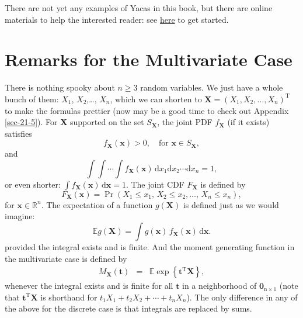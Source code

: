 \documentclass[captions=tableheading]{scrbook}
\begin{document}
There are not yet any examples of Yacas in this book, but there are online materials to help the interested reader: see \href{http://code.google.com/p/ryacas/}{here} to get started.
\section{Remarks for the Multivariate Case}
\label{sec-7-8}
\label{sec-Remarks-for-the-Multivariate}


There is nothing spooky about \(n\geq3\) random variables. We just have a whole bunch of them: \(X_{1}\), \(X_{2}\),\ldots{}, \(X_{n}\), which we can shorten to \(\mathbf{X}=(X_{1},X_{2},\ldots,X_{n})^{\mathrm{T}}\) to make the formulas prettier (now may be a good time to check out Appendix \ref{sec-21-5}). For \(\mathbf{X}\) supported on the set \(S_{\mathbf{X}}\), the joint PDF \(f_{\mathbf{X}}\) (if it exists) satisfies
\begin{equation}
f_{\mathbf{X}}(\mathbf{x})>0,\quad\mbox{for }\mathbf{x}\in S_{\mathbf{X}},
\end{equation}
and
\begin{equation}
\int\!\!\!\int\cdots\int f_{\mathbf{X}}(\mathbf{x})\,\mathrm{d} x_{1}\mathrm{d} x_{2}\cdots\mathrm{d} x_{n}=1,
\end{equation}
or even shorter: \(\int f_{\mathbf{X}}(\mathbf{x})\,\mathrm{d}\mathbf{x}=1\). The joint CDF \(F_{\mathbf{X}}\) is defined by 
\begin{equation}
F_{\mathbf{X}}(\mathbf{x})=\Pr(X_{1}\leq x_{1},\, X_{2}\leq x_{2},\ldots,\, X_{n}\leq x_{n}),
\end{equation}
for \(\mathbf{x}\in\mathbb{R}^{n}\). The expectation of a function \(g(\mathbf{X})\) is defined just as we would imagine:
\begin{equation}
\mathbb{E} g(\mathbf{X})=\int g(\mathbf{x})\, f_{\mathbf{X}}(\mathbf{x})\,\mathrm{d}\mathbf{x}.
\end{equation}
provided the integral exists and is finite. And the moment generating function in the multivariate case is defined by
\begin{eqnarray} 
M_{\mathbf{X}}(\mathbf{t}) & = & \mathbb{E}\exp\left\{ \mathbf{t}^{\mathrm{T}}\mathbf{X}\right\},
\end{eqnarray}
whenever the integral exists and is finite for all \(\mathbf{t}\) in a neighborhood of \(\mathbf{0}_{\mathrm{n}\times1}\) (note that \(\mathbf{t}^{\mathrm{T}}\mathbf{X}\) is shorthand for \(t_{1}X_{1}+t_{2}X_{2}+\cdots+t_{n}X_{n}\)). The only difference in any of the above for the discrete case is that integrals are replaced by sums. 
\end{document}
